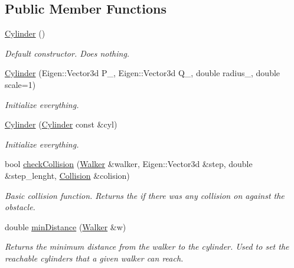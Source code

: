 \subsection*{Public Member Functions}
\begin{DoxyCompactItemize}
\item 
\mbox{\label{class_cylinder_a01dc978cb576f834b9545e43d4dad2a2}} 
\hyperlink{class_cylinder_a01dc978cb576f834b9545e43d4dad2a2}{Cylinder} ()
\begin{DoxyCompactList}\small\item\em Default constructor. Does nothing. \end{DoxyCompactList}\item 
\hyperlink{class_cylinder_a0a5f7aa0a0c5c5e17c783784fd99fa1a}{Cylinder} (Eigen\+::\+Vector3d P\+\_\+, Eigen\+::\+Vector3d Q\+\_\+, double radius\+\_\+, double scale=1)
\begin{DoxyCompactList}\small\item\em Initialize everything. \end{DoxyCompactList}\item 
\hyperlink{class_cylinder_ab5389301aa05bdee0c066e0b8026611f}{Cylinder} (\hyperlink{class_cylinder}{Cylinder} const \&cyl)
\begin{DoxyCompactList}\small\item\em Initialize everything. \end{DoxyCompactList}\item 
bool \hyperlink{class_cylinder_a43350a6331f8656dd0774a4a3b68724f}{check\+Collision} (\hyperlink{class_walker}{Walker} \&walker, Eigen\+::\+Vector3d \&step, double \&step\+\_\+lenght, \hyperlink{class_collision}{Collision} \&colision)
\begin{DoxyCompactList}\small\item\em Basic collision function. Returns the if there was any collision on against the obstacle. \end{DoxyCompactList}\item 
double \hyperlink{class_cylinder_a6eb639d12a7fc0aec50895151fb91b1f}{min\+Distance} (\hyperlink{class_walker}{Walker} \&w)
\begin{DoxyCompactList}\small\item\em Returns the minimum distance from the walker to the cylinder. Used to set the reachable cylinders that a given walker can reach. \end{DoxyCompactList}\end{DoxyCompactItemize}
